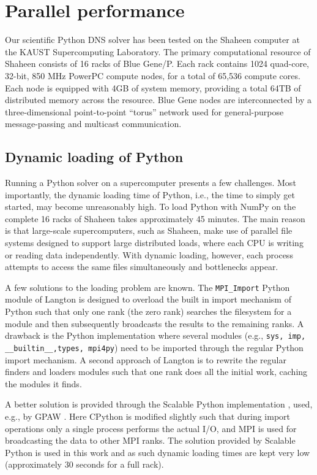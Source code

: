 \documentclass[final,3p,times,twocolumn]{elsarticle}
\newcommand{\inpyth}{\lstinline[style=inlinestyle]}
\begin{document}
\section{Parallel performance}
Our scientific Python DNS solver has been tested on the Shaheen computer at the 
KAUST Supercomputing Laboratory. The primary computational resource of Shaheen 
consists of 16 racks of Blue Gene/P. Each rack contains 1024 quad-core, 32-bit, 
850 MHz PowerPC compute nodes, for a total of 65,536 compute cores. Each node 
is equipped with 4GB of system memory, providing a total 64TB of distributed 
memory across the resource. Blue Gene nodes are interconnected by a 
three-dimensional point-to-point ``torus'' network used for general-purpose 
message-passing and multicast communication. 



\subsection{Dynamic loading of Python}
Running a Python solver on a supercomputer presents a few challenges. Most 
importantly, the dynamic loading time of Python, i.e., the time to simply get 
started, may become unreasonably high. To load Python with NumPy on the 
complete 16 racks of Shaheen takes approximately 45 minutes. The main reason is 
that large-scale supercomputers, such as Shaheen, make use of parallel file 
systems designed to support large distributed loads, where each CPU is writing 
or reading data independently. With dynamic loading, however, each process 
attempts to access the same files simultaneously and bottlenecks appear.

A few solutions to the loading problem are known. The \inpyth{MPI_Import} 
Python module of Langton \cite{mpi_import} is designed to overload the built in 
import mechanism of Python such that only one rank (the zero rank) searches the 
filesystem for a module and then subsequently broadcasts the results to the 
remaining ranks. A drawback is the Python implementation where several modules 
(e.g., \inpyth{sys, imp, __builtin__,types, mpi4py}) need to be imported 
through the regular Python import mechanism. A second approach of Langton is to 
rewrite the regular finders and loaders modules such that one rank does all the 
initial work, caching the modules it finds.

A better solution is provided through the Scalable Python implementation 
\cite{scalablepython, Enkovaara201117}, used, e.g., by GPAW \cite{gpaw05}. Here 
CPython is modified slightly such that during import operations only a single 
process performs the actual I/O, and MPI is used for broadcasting the data to 
other MPI ranks. The solution provided by Scalable Python is used in this work 
and as such dynamic loading times are kept very low (approximately 30 seconds 
for a full rack).
\end{document}
